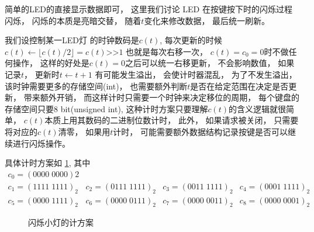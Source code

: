 \documentclass[../main.tex]{subfiles} %
\begin{document}
简单的LED的直接显示数据即可，
这里我们讨论
LED 在按键按下时的闪烁过程闪烁，
闪烁的本质是亮暗交替，
随着$t$变化来修改数据，
最后统一刷新。

我们设控制某一LED灯
的时钟数码是$c(t)$,
每次更新的时候
$c(t) \gets \lfloor c(t)/2 \rfloor = c(t) \text{>>} 1$
也就是每次右移一次，
$c(t) = c_0 = 0$时不做任何操作，
这样的好处是$c(t)=0$之后可以统一右移更新，
不会影响数值，
如果记录$t$，
更新时$t \gets t+1$
有可能发生溢出，
会使计时器混乱，
为了不发生溢出，
该时钟需要更多的存储空间(int)，
也需要额外判断$t$是否在给定范围在决定是否更新，
带来额外开销，
而这样计时只需要一个时钟来决定移位的周期，
每个键盘的存储空间只要8 bit(unsigned int),
这种计时方案只要理解$c(t)$的含义逻辑就很简单，
$c(t)$本质上用其数码的二进制位数计时，
此外，
如果请求被关闭，
只需要将对应的$c(t)$清零，
如果用$t$计时，
可能需要额外数据结构记录按键是否可以继续进行闪烁操作。

具体计时方案如%
\cref{fig:blink},
其中
\[
  \begin{matrix}
    c_0 = (0000 \; 0000)2 \\
    c_1 = (1111\; 1111)_2 &
    c_2 = (0111\; 1111)_2 &
    c_3 = (0011\;1111)_2 &
    c_4 = (0001\;1111)_2 \\
    c_5 = (0000\;1111)_2 &
    c_6 = (0000\;0111)_2 &
    c_7 = (0000\;0011)_2 &
    c_8 = (0000\;0001)_2 &
  \end{matrix}
\]

\begin{figure}[H]
  \centering
  \def\svgwidth{\linewidth}
  
  \caption{闪烁小灯的计方案}
  \label{fig:blink}
\end{figure}
\end{document}
